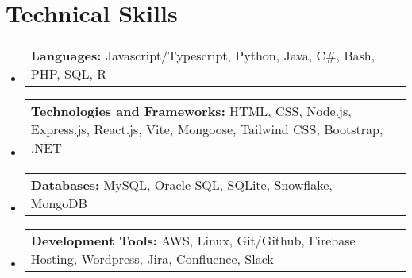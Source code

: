 \documentclass[letterpaper,11pt]{article}
\makeatletter
\newcommand{\resumeSubItem}[2]{ 
  \item
    \begin{tabular*}{\textwidth}{@{}l@{}l}
      {\small\textbf{#1}} {\small #2} \\ 
    \end{tabular*}\vspace{-6pt}
}
\newcommand{\resumeSubHeadingListStart}{\begin{itemize}[leftmargin=0.0in, label={}]}
\newcommand{\resumeSubHeadingListEnd}{\end{itemize}}
\makeatother
\begin{document}
\section{Technical Skills}
  \resumeSubHeadingListStart
    \resumeSubItem{Languages:}
      {Javascript/Typescript, Python, Java, C\#, Bash, PHP, SQL, R}
      \resumeSubItem{Technologies and Frameworks:}
      {HTML, CSS, Node.js, Express.js, React.js, Vite, Mongoose, Tailwind CSS, Bootstrap, .NET}
    \resumeSubItem{Databases:}
      {MySQL, Oracle SQL, SQLite, Snowflake, MongoDB}
    \resumeSubItem{Development Tools:}
      {AWS, Linux, Git/Github, Firebase Hosting, Wordpress, Jira, Confluence, Slack}
  \resumeSubHeadingListEnd
\end{document}

